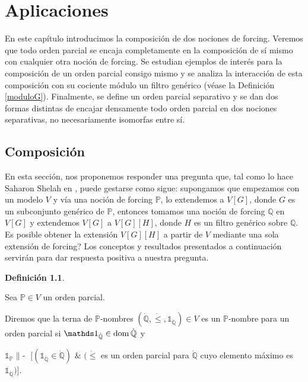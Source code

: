 \documentclass[11pt]{unam_tesis1}
\theoremstyle{MyThmStyle}
\theoremstyle{definition}
\newtheorem{definition}{Definici\'on}[chapter]
\theoremstyle{plain}
\theoremstyle{remark}
\def\dom{\mathop{\rm dom}\nolimits}
\def\forces{\mathop{\parallel\!\!\!-}\nolimits}
\let\Vdash\forces
\let\leq\leqslant
\begin{document}
\chapter{Aplicaciones}

En este cap\'itulo introducimos la composici\'on de dos nociones de forcing. Veremos que todo orden parcial se encaja completamente en la composici\'on de s\'i mismo con cualquier otra noci\'on de forcing. Se estudian ejemplos de inter\'es para la composici\'on de un orden parcial consigo mismo y se analiza la interacci\'on  de esta composici\'on con su cociente m\'odulo un filtro gen\'erico (v\'ease la Definici\'on \ref{moduloG}). Finalmente, se define un orden parcial separativo y se dan dos formas distintas de encajar densamente todo orden parcial en dos nociones separativas, no necesariamente isomorfas entre s\'i.


\section{Composici\'on}

En esta secci\'on, nos proponemos responder una pregunta que, tal como lo hace Saharon Shelah en \cite{shelah}, puede gestarse como sigue: supongamos que empezamos con un modelo $V$ y v\'ia una noci\'on de forcing $\mathbb P$, lo extendemos a $V[G]$, donde $G$ es un subconjunto gen\'erico de $\mathbb P$, entonces tomamos una noci\'on de forcing $\mathbb Q$ en $V[G]$ y extendemos $V[G]$ a $V[G][H]$, donde $H$ es un filtro gen\'erico sobre $\mathbb Q$. \textquestiondown Es posible obtener la extensi\'on $V[G][H]$ a partir de $V$ mediante una sola extensi\'on de forcing? Los conceptos y resultados presentados a continuaci\'on servir\'an para dar respuesta positiva a nuestra pregunta.

\begin{definition}\label{pnombre}

Sea $\mathbb P\in V$ un orden parcial.

Diremos que la terna de $\mathbb P$-nombres $(\dot{\mathbb Q},\dot{\leq}, \mathds 1_{\dot{\mathbb Q}})\in V$ es un $\mathbb P$-nombre para un orden parcial si $\mathds 1_{\dot{\mathbb Q}}\in \dom \dot{\mathbb Q}$ y

\begin{center}
$\mathds{1}_{\mathbb P}\Vdash$ $[(\mathds 1_{\dot{\mathbb Q}}\in \dot{\mathbb Q})$ $\&$ $(\dot{\leq}$ es un orden parcial para $\dot{\mathbb Q}$ cuyo elemento m\'aximo es $\mathds 1_{\dot{\mathbb Q}})]$.
\end{center} 
\end{definition}
\end{document}
